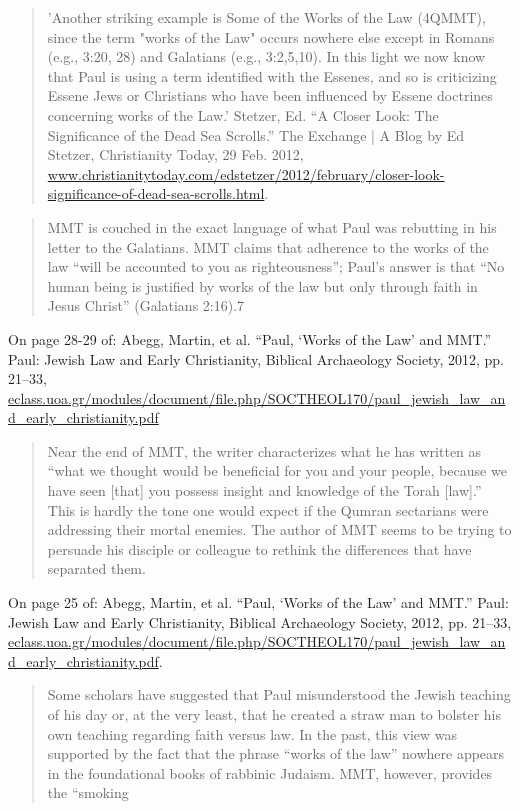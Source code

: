 \documentclass[11pt]{article}
\begin{document}
\begin{thebibliography}{37}
\begin{quote}
'Another striking example is Some of the Works of the Law (4QMMT), since the term "works of the Law" occurs nowhere else except in Romans (e.g., 3:20, 28) and Galatians (e.g., 3:2,5,10). In this light we now know that Paul is using a term identified with the Essenes, and so is criticizing Essene Jews or Christians who have been influenced by Essene doctrines concerning works of the Law.' 
Stetzer, Ed. “A Closer Look: The Significance of the Dead Sea Scrolls.” The Exchange | A Blog by Ed Stetzer, Christianity Today, 29 Feb. 2012, \url{www.christianitytoday.com/edstetzer/2012/february/closer-look-significance-of-dead-sea-scrolls.html}.
\end{quote}
\begin{quote}
MMT is couched in the exact language of what Paul was rebutting in his
letter to the Galatians. MMT claims that adherence to the works of the law “will
be accounted to you as righteousness”; Paul’s answer is that “No human being is justified by works of the law but only through faith in Jesus Christ” (Galatians
2:16).7
\end{quote}
On page 28-29 of:
Abegg, Martin, et al. “Paul, ‘Works of the Law’ and MMT.” Paul: Jewish Law and Early Christianity, Biblical Archaeology Society, 2012, pp. 21–33, \url{eclass.uoa.gr/modules/document/file.php/SOCTHEOL170/paul_jewish_law_and_early_christianity.pdf}
\begin{quote}
Near the end of MMT, the writer characterizes what he has written
as “what we thought would be beneficial for you and your people, because we
have seen [that] you possess insight and knowledge of the Torah [law].” This is
hardly the tone one would expect if the Qumran sectarians were addressing their
mortal enemies. The author of MMT seems to be trying to persuade his disciple
or colleague to rethink the differences that have separated them.
\end{quote}
On page 25 of:
Abegg, Martin, et al. “Paul, ‘Works of the Law’ and MMT.” Paul: Jewish Law and Early Christianity, Biblical Archaeology Society, 2012, pp. 21–33, \url{eclass.uoa.gr/modules/document/file.php/SOCTHEOL170/paul_jewish_law_and_early_christianity.pdf}.
\begin{quote}
Some scholars have suggested that Paul misunderstood the Jewish
teaching of his day or, at the very least, that he created a straw man to bolster
his own teaching regarding faith versus law. In the past, this view was supported
by the fact that the phrase “works of the law” nowhere appears in the foundational books of rabbinic Judaism. MMT, however, provides the “smoking

\end{quote}
\end{thebibliography}
\end{document}
